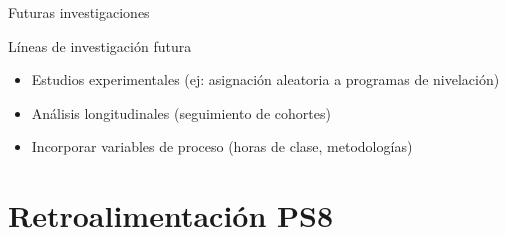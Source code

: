 \documentclass[aspectratio=169, 11pt]{beamer}
\begin{document}
\begin{frame}{Futuras investigaciones}
\begin{exampleblock}{Líneas de investigación futura}
\begin{itemize}
\item Estudios experimentales (ej: asignación aleatoria a programas de nivelación)
\item Análisis longitudinales (seguimiento de cohortes)
\item Incorporar variables de proceso (horas de clase, metodologías)
\end{itemize}
\end{exampleblock}
\end{frame}

\section{Retroalimentación PS8}
\end{document}
